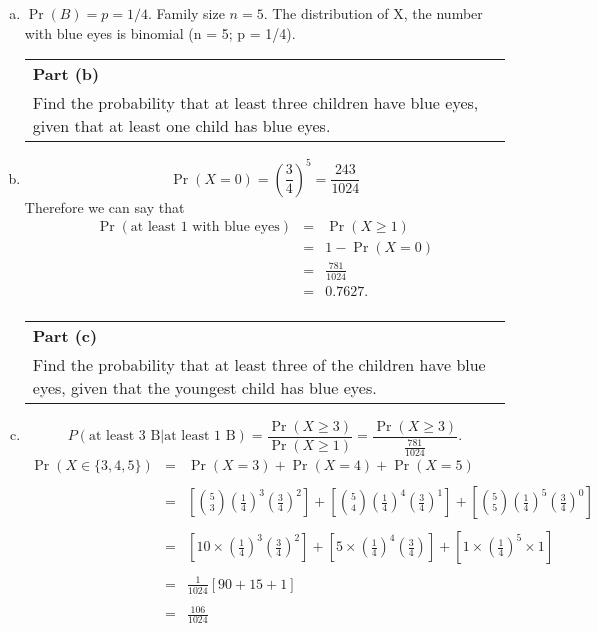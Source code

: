 \documentclass[a4paper,12pt]{article}
\begin{document}
\begin{enumerate}[(a)]
\item $\Pr(B) = p = 1/4$. Family size $n = 5$. 
The distribution of X, the number with blue
eyes is binomial (n = 5; p = 1/4).
  \begin{table}[ht!]
     \centering
     \begin{tabular}{|p{15cm}|}
     \hline  
\noindent \textbf{Part (b)}\\ Find the probability that at least three children have blue eyes, given that at least one child has blue eyes. \\ \hline 
      \end{tabular}
    \end{table}
\item \[\Pr(X=0) = \left(\frac{3}{4}\right)^5 = \frac{243}{1024} \] 
Therefore we can say that
\begin{eqnarray*}
\Pr(\mbox{at least 1 with blue eyes}) 
&=& \Pr(X\geq 1) \\
&=& 1 - \Pr(X=0)\\ 
&=& \frac{781}{1024}\\
&=& 0.7627.\\
\end{eqnarray*}
  \begin{table}[ht!]
     \centering
     \begin{tabular}{|p{15cm}|}
     \hline  
\noindent \textbf{Part (c)}\\Find the probability that at least three of the children have blue eyes, given that the youngest child has blue eyes.
\\ \hline
      \end{tabular}
    \end{table}
\item  
\[
P(\mbox{at least 3 B} | \mbox{at least 1 B})= \frac{\Pr(X \geq 3)}{\Pr( X \geq 1)}
= \frac{\Pr(X \geq 3)}{\frac{781}{1024}}.
\]
\begin{eqnarray*}
\Pr(X \in \{3,4,5\}) &=&  \Pr(X=3) + \Pr(X=4) + \Pr(X=5)\\\\
&=& \left[ {5 \choose 3} \left(\frac{1}{4}\right)^3  \left(\frac{3}{4}\right)^2 \right]+ 
    \left[ {5 \choose 4} \left(\frac{1}{4}\right)^4  \left(\frac{3}{4}\right)^1 \right]+ 
    \left[ {5 \choose 5} \left(\frac{1}{4}\right)^5  \left(\frac{3}{4}\right)^0\right]\\\\
&=& \left[ 10 \times \left(\frac{1}{4}\right)^3  \left(\frac{3}{4}\right)^2\right] + 
    \left[ 5 \times \left(\frac{1}{4}\right)^4  \left(\frac{3}{4}\right)\right] + 
    \left[ 1 \times \left(\frac{1}{4}\right)^5  \times 1 \right]\\\\
&=& \frac{1}{1024} \left[ 90 + 15 + 1 \right] \\\\
&=& \frac{106}{1024}
\end{eqnarray*}


\end{enumerate}
\end{document}
